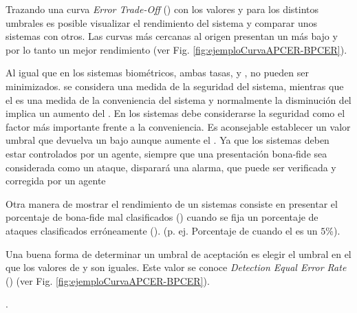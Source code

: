 Trazando una curva \textit{Error Trade-Off} () con los valores  y  para los distintos umbrales es posible visualizar el rendimiento del sistema  y comparar unos sistemas con otros. Las curvas más cercanas al origen presentan un  más bajo y por lo tanto un mejor rendimiento (ver Fig. \ref{fig:ejemploCurvaAPCER-BPCER}). 

Al igual que en los sistemas biométricos, ambas tasas,  y , no pueden ser minimizados.  se considera una medida de la seguridad del sistema, mientras que el  es una medida de la conveniencia del sistema y normalmente la disminución del  implica un aumento del . En los sistemas  debe considerarse la seguridad como el factor más importante frente a la conveniencia. Es aconsejable establecer un valor umbral que devuelva un bajo  aunque aumente el . Ya que los sistemas  deben estar controlados por un agente, siempre que una presentación \gls{bona-fide} sea considerada como un ataque, disparará una alarma, que puede ser verificada y corregida por un agente

Otra manera de mostrar el rendimiento de un sistemas  consiste en presentar el porcentaje de \gls{bona-fide} mal clasificados () cuando se fija un porcentaje de ataques clasificados erróneamente (). (p. ej. Porcentaje de  cuando el  es un $5$\%).

Una buena forma de determinar un umbral de aceptación es elegir el umbral en el que los valores de  y  son iguales. Este valor se conoce \textit{Detection Equal Error Rate} () (ver Fig. \ref{fig:ejemploCurvaAPCER-BPCER}).

.





